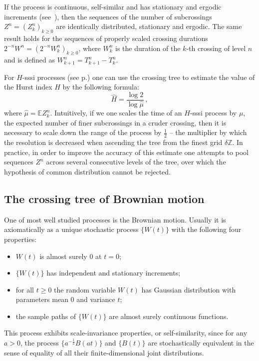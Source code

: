 \documentclass[a4paper]{article}
\newcommand{\ex}{\mathbb{E}}
\begin{document}
If the process is continuous, self-similar and has stationary and ergodic increments
(see~\cite{jonesshen2005}), then the sequences of the number of subcrossings $Z^n = (Z_k^n)_{k\geq 0}$
are identically distributed, stationary and ergodic. The same result holds for
the sequences of properly scaled crossing durations $2^{-n} W^n = (2^{-n} W_k^n)_{k\geq0}$,
where $W_k^n$ is the duration of the $k$-th crossing of level $n$ and is defined
as $W_{k+1}^n = T_{k+1}^n - T_k^n$.

For $H$-sssi processes (see p.\pageref{eq:def_ss}) one can use the crossing tree
to estimate the value of the Hurst index $H$ by the following formula:
\[ \hat{H} = \frac{\log 2}{\log \hat{\mu}} \,,\]
where $\hat{\mu} = \ex Z_k^n$. Intuitively, if we one scales the time of an $H$-sssi
process by $\mu$, the expected number of finer subcrossings in a cruder crossing,
then it is necessary to scale down the range of the process by $\tfrac{1}{2}$ --
the multiplier by which the resolution is decreased when ascending the tree from
the finest grid $\delta \mathbb{Z}$. In practice, in order to improve the accuracy of
this estimate one attempts to pool sequences $Z^n$ across several consecutive levels
of the tree, over which the hypothesis of common distribution cannot be rejected.


\subsection{The crossing tree of Brownian motion} %
\label{sub:the_crossing_tree_of_brownian_motion}

One of most well studied processes is the Brownian motion. Usually it is axiomatically
as a unique stochastic process $\bigl\{W(t)\bigr\}$ with the following four properties:
\begin{itemize}
    \item $W(t)$ is almost surely $0$ at $t=0$;
    \item $\{W(t)\}$ has independent and stationary increments;
    \item for all $t\geq 0$ the random variable $W(t)$ has Gaussian distribution with
    parameters mean $0$ and variance $t$;
    \item the sample paths of $\{W(t)\}$ are almost surely continuous functions.
\end{itemize}
This process exhibits scale-invariance properties, or self-similarity, since for any
$a>0$, the process $\bigl\{a^{-\tfrac{1}{2}} B(at)\bigr\}$ and $\{B(t)\}$ are stochastically
equivalent in the sense of equality of all their finite-dimensional joint distributions.
\end{document}
